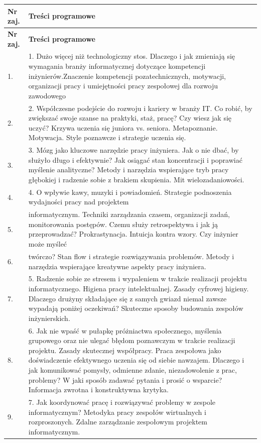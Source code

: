 \documentclass[12pt, a4paper]{article}
\newcommand{\thdrule}{\noalign{\global\setlength{\extrarowheight}{0pt}}}
\newcommand{\thdend}{\noalign{\global\setlength{\extrarowheight}{3pt}}}
\begin{document}
{\scriptsize
\begin{longtable}{m{1.5cm}m{14.5cm}}
\thdrule\toprule
\rowcolor{pjatkRed} {\color{white}\textbf{Nr zaj.}} & {\color{white}\textbf{Treści programowe}} \\
\midrule\thdend
\endfirsthead
\thdrule\toprule
\rowcolor{pjatkRed} {\color{white}\textbf{Nr zaj.}} & {\color{white}\textbf{Treści programowe}} \\
\midrule\thdend
\endhead
  \rowcolor{tableRowLight} 1. & 1. Dużo więcej niż technologiczny stos. Dlaczego i jak zmieniają się wymagania branży informatycznej dotyczące kompetencji inżynierów.Znaczenie kompetencji pozatechnicznych, motywacji, organizacji pracy i umiejętności pracy zespołowej dla rozwoju zawodowego \\
  \rowcolor{tableRowAlt} 2. & 2. Współczesne podejście do rozwoju i kariery w branży IT. Co robić, by zwiększać swoje szanse na praktyki, staż, pracę? Czy wiesz jak się uczyć? Krzywa uczenia się juniora vs. seniora. Metapoznanie. Motywacja. Style poznawcze i strategie uczenia się. \\
  \rowcolor{tableRowLight} 3. & 3. Mózg jako kluczowe narzędzie pracy inżyniera. Jak o nie dbać, by służyło długo i efektywnie? Jak osiągać stan koncentracji i poprawiać myślenie analityczne? Metody i narzędzia wspierające tryb pracy głębokiej i radzenie sobie z brakiem skupienia. Mit wielozadaniowości. \\
  \rowcolor{tableRowAlt} 4. & 4. O wpływie kawy, muzyki i powiadomień. Strategie podnoszenia wydajności pracy nad projektem \\
  \rowcolor{tableRowLight} 5. & informatycznym. Techniki zarządzania czasem, organizacji zadań, monitorowania postępów. Czemu służy retrospektywa i jak ją przeprowadzać? Prokrastynacja. Intuicja kontra wzory. Czy inżynier może myśleć \\
  \rowcolor{tableRowAlt} 6. & twórczo? Stan flow i strategie rozwiązywania problemów. Metody i narzędzia wspierające kreatywne aspekty pracy inżyniera. \\
  \rowcolor{tableRowLight} 7. & 5. Radzenie sobie ze stresem i wypaleniem w trakcie realizacji projektu informatycznego. Higiena pracy intelektualnej. Zasady cyfrowej higieny. Dlaczego drużyny składające się z samych gwiazd niemal zawsze wypadają poniżej oczekiwań? Skuteczne sposoby budowania zespołów inżynierskich. \\
  \rowcolor{tableRowAlt} 8. & 6. Jak nie wpaść w pułapkę próżniactwa społecznego, myślenia grupowego oraz nie ulegać błędom poznawczym w trakcie realizacji projektu. Zasady skutecznej współpracy. Praca zespołowa jako doświadczenie efektywnego uczenia się od siebie nawzajem. Dlaczego i jak komunikować pomysły, odmienne zdanie, niezadowolenie z prac, problemy? W jaki sposób zadawać pytania i prosić o wsparcie? Informacja zwrotna i konstruktywna krytyka. \\
  \rowcolor{tableRowLight} 9. & 7. Jak koordynować pracę i rozwiązywać problemy w zespole informatycznym? Metodyka pracy zespołów wirtualnych i rozproszonych. Zdalne zarządzanie zespołowym projektem informatycznym. \\
\bottomrule
\end{longtable}}
\end{document}
